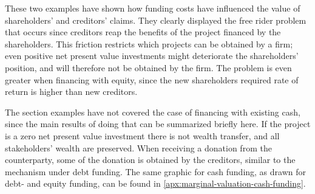 \documentclass[main.tex]{subfiles}
\begin{document}
    These two examples have shown how funding costs have influenced 
    the value of shareholders' and creditors' claims.
    They clearly displayed the free rider problem that occurs
    since creditors reap the benefits of the project financed by the shareholders.
    This friction restricts which projects can be obtained by a firm;
    even positive net present value investments might deteriorate the shareholders' position,
    and will therefore not be obtained by the firm.
    The problem is even greater when financing with equity, 
    since the new shareholders required rate of return is higher than new creditors.
    
    The section examples have not covered the case of financing with existing cash,
    since the main results of doing that can be summarized briefly here.
    If the project is a zero net present value investment there is not wealth transfer,
    and all stakeholders' wealth are preserved.
    When receiving a donation from the counterparty, 
    some of the donation is obtained by the creditors, similar to the mechanism under debt funding.
    The same graphic for cash funding, as drawn for debt- and equity funding, can be found in 
    \cref{apx:marginal-valuation-cash-funding}.
\end{document}
